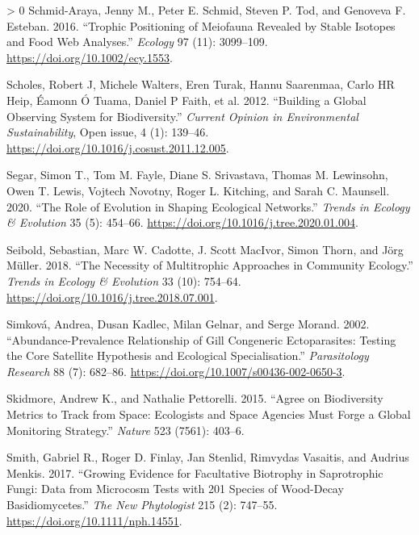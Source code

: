 \documentclass[10pt,oneside]{article}
\newlength{\cslhangindent}
\newenvironment{CSLReferences}[3] %
 {%
  \setlength{\parindent}{0pt}
  \ifodd #1 \everypar{\setlength{\hangindent}{\cslhangindent}}\ignorespaces\fi
  \ifnum #2 > 0
  \setlength{\parskip}{#2\baselineskip}
  \fi
 }%
 {}
\begin{document}
\begin{CSLReferences}{1}{0}
\leavevmode\hypertarget{ref-Schmid-Araya2016TroPos}{}%
Schmid-Araya, Jenny M., Peter E. Schmid, Steven P. Tod, and Genoveva F.
Esteban. 2016. {``Trophic Positioning of Meiofauna Revealed by Stable
Isotopes and Food Web Analyses.''} \emph{Ecology} 97 (11): 3099--109.
\url{https://doi.org/10.1002/ecy.1553}.

\leavevmode\hypertarget{ref-Scholes2012BuiGlo}{}%
Scholes, Robert J, Michele Walters, Eren Turak, Hannu Saarenmaa, Carlo
HR Heip, Éamonn Ó Tuama, Daniel P Faith, et al. 2012. {``Building a
Global Observing System for Biodiversity.''} \emph{Current Opinion in
Environmental Sustainability}, Open issue, 4 (1): 139--46.
\url{https://doi.org/10.1016/j.cosust.2011.12.005}.

\leavevmode\hypertarget{ref-Segar2020RolEvo}{}%
Segar, Simon T., Tom M. Fayle, Diane S. Srivastava, Thomas M. Lewinsohn,
Owen T. Lewis, Vojtech Novotny, Roger L. Kitching, and Sarah C.
Maunsell. 2020. {``The Role of Evolution in Shaping Ecological
Networks.''} \emph{Trends in Ecology \& Evolution} 35 (5): 454--66.
\url{https://doi.org/10.1016/j.tree.2020.01.004}.

\leavevmode\hypertarget{ref-Seibold2018NecMul}{}%
Seibold, Sebastian, Marc W. Cadotte, J. Scott MacIvor, Simon Thorn, and
Jörg Müller. 2018. {``The Necessity of Multitrophic Approaches in
Community Ecology.''} \emph{Trends in Ecology \& Evolution} 33 (10):
754--64. \url{https://doi.org/10.1016/j.tree.2018.07.001}.

\leavevmode\hypertarget{ref-Simkova2002AbuRel}{}%
Simková, Andrea, Dusan Kadlec, Milan Gelnar, and Serge Morand. 2002.
{``Abundance-Prevalence Relationship of Gill Congeneric Ectoparasites:
Testing the Core Satellite Hypothesis and Ecological Specialisation.''}
\emph{Parasitology Research} 88 (7): 682--86.
\url{https://doi.org/10.1007/s00436-002-0650-3}.

\leavevmode\hypertarget{ref-Skidmore2015AgrBio}{}%
Skidmore, Andrew K., and Nathalie Pettorelli. 2015. {``Agree on
Biodiversity Metrics to Track from Space: Ecologists and Space Agencies
Must Forge a Global Monitoring Strategy.''} \emph{Nature} 523 (7561):
403--6.

\leavevmode\hypertarget{ref-Smith2017GroEvi}{}%
Smith, Gabriel R., Roger D. Finlay, Jan Stenlid, Rimvydas Vasaitis, and
Audrius Menkis. 2017. {``Growing Evidence for Facultative Biotrophy in
Saprotrophic Fungi: Data from Microcosm Tests with 201 Species of
Wood-Decay Basidiomycetes.''} \emph{The New Phytologist} 215 (2):
747--55. \url{https://doi.org/10.1111/nph.14551}.


\end{CSLReferences}
\end{document}
